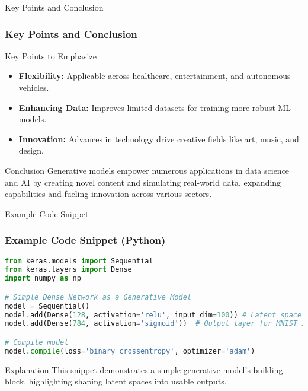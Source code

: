 \documentclass[aspectratio=169]{beamer}
\begin{document}
\begin{frame}{Key Points and Conclusion}
    \frametitle{Key Points and Conclusion}
    \begin{block}{Key Points to Emphasize}
        \begin{itemize}
            \item \textbf{Flexibility:} Applicable across healthcare, entertainment, and autonomous vehicles.
            \item \textbf{Enhancing Data:} Improves limited datasets for training more robust ML models.
            \item \textbf{Innovation:} Advances in technology drive creative fields like art, music, and design.
        \end{itemize}
    \end{block}

    \begin{block}{Conclusion}
        Generative models empower numerous applications in data science and AI by creating novel content and simulating real-world data, expanding capabilities and fueling innovation across various sectors.
    \end{block}
\end{frame}

\begin{frame}[fragile]{Example Code Snippet}
    \frametitle{Example Code Snippet (Python)}
    
    \begin{lstlisting}[language=Python]
from keras.models import Sequential
from keras.layers import Dense
import numpy as np

# Simple Dense Network as a Generative Model
model = Sequential()
model.add(Dense(128, activation='relu', input_dim=100)) # Latent space
model.add(Dense(784, activation='sigmoid'))  # Output layer for MNIST images

# Compile model
model.compile(loss='binary_crossentropy', optimizer='adam')
    \end{lstlisting}
    
    \begin{block}{Explanation}
        This snippet demonstrates a simple generative model's building block, highlighting shaping latent spaces into usable outputs.
    \end{block}
\end{frame}
\end{document}

